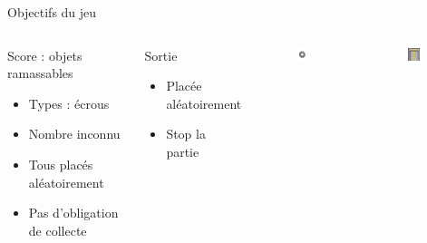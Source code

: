 \documentclass{beamer}
\begin{document}
{\begin{frame}{Objectifs du jeu}
    \begin{columns}
        \begin{block}{Score : objets ramassables}
            \begin{itemize}
                \item[\bullet] Types : écrous
                \item[\bullet] Nombre inconnu
                \item[\bullet] Tous placés aléatoirement
                \item[\bullet] Pas d'obligation de collecte
            \end{itemize}
        \end{block}
        \begin{block}{Sortie}
            \begin{itemize}
                \item[\bullet] Placée aléatoirement
                \item[\bullet] Stop la partie
            \end{itemize}
        \end{block}
        \begin{figure}
            \centering
            \includegraphics[width=0.6\textwidth]{images/nut}
        \end{figure}
        \begin{figure}
            \centering
            \includegraphics[width=0.6\textwidth]{images/exit}
        \end{figure}


\end{columns}
\end{frame}}
\end{document}
